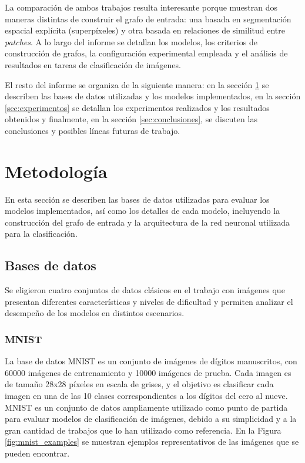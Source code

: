 \documentclass{article}
\begin{document}
La comparación de ambos trabajos resulta interesante porque muestran dos maneras distintas de construir el grafo de entrada: una basada en segmentación espacial explícita (superpíxeles) y otra basada en relaciones de similitud entre \textit{patches}. A lo largo del informe se detallan los modelos, los criterios de construcción de grafos, la configuración experimental empleada y el análisis de resultados en tareas de clasificación de imágenes.

El resto del informe se organiza de la siguiente manera: en la sección \ref{sec:metodologia} se describen las bases de datos utilizadas y los modelos implementados, en la sección \ref{sec:experimentos} se detallan los experimentos realizados y los resultados obtenidos y finalmente, en la sección \ref{sec:conclusiones}, se discuten las conclusiones y posibles líneas futuras de trabajo.

\section{Metodología}
\label{sec:metodologia}
En esta sección se describen las bases de datos utilizadas para evaluar los modelos implementados, así como los detalles de cada modelo, incluyendo la construcción del grafo de entrada y la arquitectura de la red neuronal utilizada para la clasificación.

\subsection{Bases de datos}
\label{subsec:datasets}
Se eligieron cuatro conjuntos de datos clásicos en el trabajo con imágenes que presentan diferentes características y niveles de dificultad y permiten analizar el desempeño de los modelos en distintos escenarios.

\subsubsection{MNIST}
La base de datos MNIST \cite{deng2012mnist} es un conjunto de imágenes de dígitos manuscritos, con 60000 imágenes de entrenamiento y 10000 imágenes de prueba. Cada imagen es de tamaño 28x28 píxeles en escala de grises, y el objetivo es clasificar cada imagen en una de las 10 clases correspondientes a los dígitos del cero al nueve. MNIST es un conjunto de datos ampliamente utilizado como punto de partida para evaluar modelos de clasificación de imágenes, debido a su simplicidad y a la gran cantidad de trabajos que lo han utilizado como referencia. En la Figura \ref{fig:mnist_examples} se muestran ejemplos representativos de las imágenes que se pueden encontrar.
\end{document}
